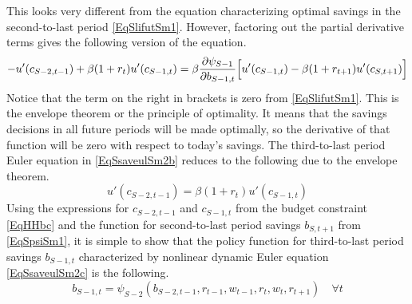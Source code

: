 \documentclass[letterpaper,12pt]{article}
\theoremstyle{definition}
\numberwithin{equation}{section}
\numberwithin{exercise}{section}
\begin{document}
\begin{spacing}{1.5}
      This looks very different from the equation characterizing optimal savings in the second-to-last period \eqref{EqSlifutSm1}. However, factoring out the partial derivative terms gives the following version of the equation.
      \begin{equation}\label{EqSsaveulSm2b}
         -u'(c_{S-2,t-1}) + \beta(1+r_t)u'(c_{S-1,t}) = \beta\frac{\partial\psi_{S-1}}{\partial b_{S-1,t}}\Bigl[u'(c_{S-1,t}) - \beta(1+r_{t+1})u'(c_{S,t+1})\Bigr]
      \end{equation}
      Notice that the term on the right in brackets is zero from \eqref{EqSlifutSm1}. This is the envelope theorem or the principle of optimality. It means that the savings decisions in all future periods will be made optimally, so the derivative of that function will be zero with respect to today's savings. The third-to-last period Euler equation in \eqref{EqSsaveulSm2b} reduces to the following due to the envelope theorem.
      \begin{equation}\label{EqSsaveulSm2c}
         u'(c_{S-2,t-1}) = \beta(1+r_t)u'(c_{S-1,t})
      \end{equation}
      Using the expressions for $c_{S-2,t-1}$ and $c_{S-1,t}$ from the budget constraint \eqref{EqHHbc} and the function for second-to-last period savings $b_{S,t+1}$ from \eqref{EqSpsiSm1}, it is simple to show that the policy function for third-to-last period savings $b_{S-1,t}$ characterized by nonlinear dynamic Euler equation \eqref{EqSsaveulSm2c} is the following.
      \begin{equation}\label{EqSpsiSm2}
         b_{S-1,t} = \psi_{S-2}\left(b_{S-2,t-1}, r_{t-1}, w_{t-1}, r_{t}, w_{t}, r_{t+1}\right) \quad\forall t
      \end{equation}


\end{spacing}
\end{document}
